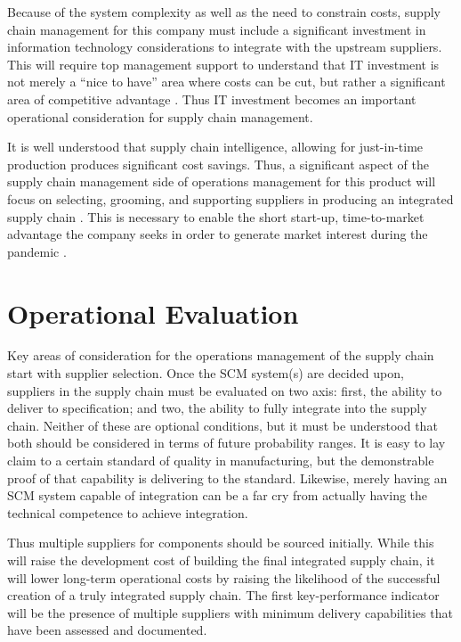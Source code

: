 \documentclass[man]{apa7}
\begin{document}
Because of the system complexity as well as the need to constrain costs, supply chain management for this company must include a significant investment in information technology considerations to integrate with the upstream suppliers. This will require top management support to understand that IT investment is not merely a ``nice to have'' area where costs can be cut, but rather a significant area of competitive advantage \parencite{daneshvarEffectiveFactorsImplementing2020}. Thus IT investment becomes an important operational consideration for supply chain management.

It is well understood that supply chain intelligence, allowing for just-in-time production produces significant cost savings. Thus, a significant aspect of the supply chain management side of operations management for this product will focus on selecting, grooming, and supporting suppliers in producing an integrated supply chain \parencite{yangAchievingJustTime2021}.   This is necessary to enable the short start-up, time-to-market advantage the company seeks in order to generate market interest during the pandemic \parencite{ghobakhlooCorporateSurvivalIndustry2020}.

\section{Operational Evaluation}
\label{sec:orgc17a42f}

Key areas of consideration for the operations management of the supply chain start with supplier selection. Once the SCM system(s) are decided upon, suppliers in the supply chain must be evaluated on two axis: first, the ability to deliver to specification; and two, the ability to fully integrate into the supply chain. Neither of these are optional conditions, but it must be understood that both should be considered in terms of future probability ranges. It is easy to lay claim to a certain standard of quality in manufacturing, but the demonstrable proof of that capability is delivering to the standard. Likewise, merely having an SCM system capable of integration can be a far cry from actually having the technical competence to achieve integration.

Thus multiple suppliers for components should be sourced initially. While this will raise the development cost of building the final integrated supply chain, it will lower long-term operational costs by raising the likelihood of the successful creation of a truly integrated supply chain. The first key-performance indicator will be the presence of multiple suppliers with minimum delivery capabilities that have been assessed and documented.
\end{document}
